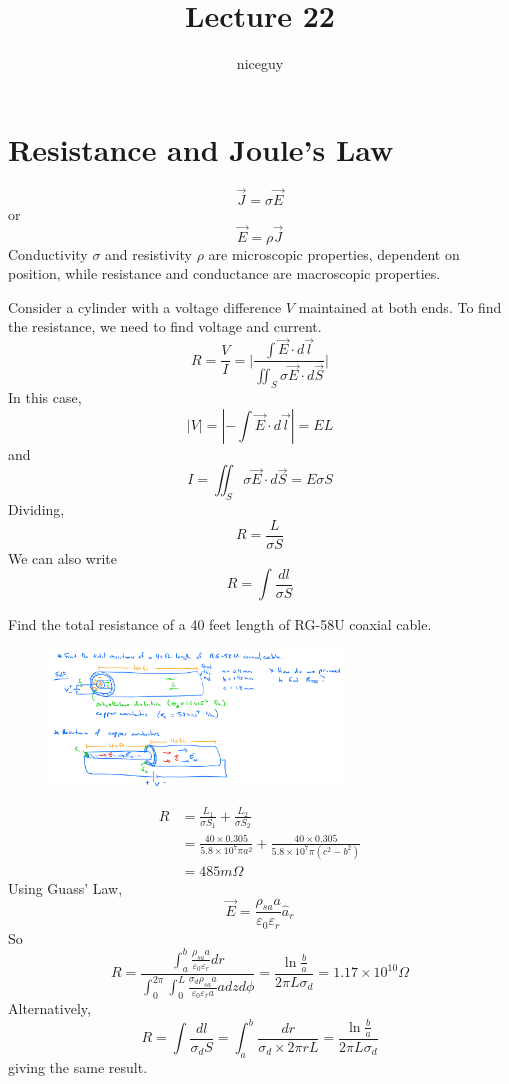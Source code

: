 \documentclass[12pt]{article}
\author{niceguy}
\title{Lecture 22}
\begin{document}
\maketitle

\section{Resistance and Joule's Law}

$$\vec{J} = \sigma\vec{E}$$
or
$$\vec{E} = \rho\vec{J}$$
Conductivity $\sigma$ and resistivity $\rho$ are microscopic properties, dependent on position, while resistance and conductance are macroscopic properties.

\begin{ex}
	Consider a cylinder with a voltage difference $V$ maintained at both ends. To find the resistance, we need to find voltage and current.
	$$R = \frac{V}{I} = \Bigg | \frac{\int\vec{E}\cdot d\vec{l}}{\iint_S \sigma\vec{E}\cdot d\vec{S}} \Bigg |$$
	In this case,
	$$|V| = |-\int\vec{E}\cdot d\vec{l}| = EL$$
	and
	$$I = \iint_S \sigma\vec{E} \cdot d\vec{S} = E\sigma S$$
	Dividing,
	$$R = \frac{L}{\sigma S}$$
	We can also write
	$$R = \int\frac{dl}{\sigma S}$$
\end{ex}

\begin{ex}
	Find the total resistance of a 40 feet length of RG-58U coaxial cable.
	\begin{figure}
		\centering
		\includegraphics[width=0.7\textwidth]{coaxial.png}
	\end{figure}
	\begin{align*}
		R &= \frac{L_1}{\sigma S_1} + \frac{L_2}{\sigma S_2} \\
		  &= \frac{40\times0.305}{5.8\times10^7\pi a^2} + \frac{40\times0.305}{5.8\times10^7\pi(c^2-b^2)} \\
		  &= 485\unit{m\Omega}
	\end{align*}
	Using Guass' Law,
	$$\vec{E} = \frac{\rho_{sa}a}{\varepsilon_0\varepsilon_r}\hat{a}_r$$
	So
	$$R = \frac{\int_a^b \frac{\rho_{sa}a}{\varepsilon_0\varepsilon_r}dr}{\int_0^{2\pi}\int_0^L \frac{\sigma_d \rho_{sa}a}{\varepsilon_0\varepsilon_r a} adzd\phi} = \frac{\ln\frac{b}{a}}{2\pi L\sigma_d} = 1.17\times10^{10} \unit{\Omega}$$
	Alternatively,
	$$R = \int\frac{dl}{\sigma_d S} = \int_a^b \frac{dr}{\sigma_d \times 2\pi rL} = \frac{\ln\frac{b}{a}}{2\pi L\sigma_d}$$
	giving the same result.
\end{ex}
\end{document}
